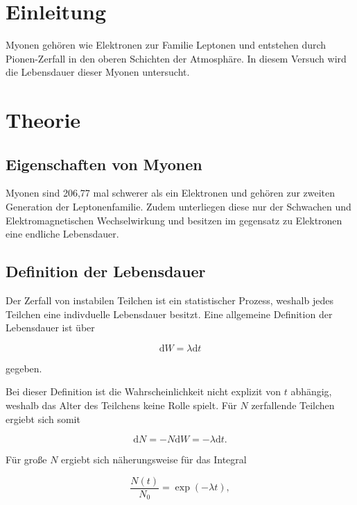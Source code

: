\section{Einleitung} %
\label{sec:einleitung}

Myonen gehören wie Elektronen zur Familie Leptonen und entstehen durch Pionen-Zerfall in den oberen Schichten der Atmosphäre.
In diesem Versuch wird die Lebensdauer dieser Myonen untersucht.

\section{Theorie} %
\label{sec:theorie}
\FloatBarrier
\subsection{Eigenschaften von Myonen} %
\label{sub:eigenschaften_von_myonen}

Myonen sind 206,77 mal schwerer als ein Elektronen und gehören zur zweiten Generation der Leptonenfamilie.
Zudem unterliegen diese nur der Schwachen und Elektromagnetischen Wechselwirkung und besitzen im gegensatz zu Elektronen eine endliche Lebensdauer.
\FloatBarrier
\subsection{Definition der Lebensdauer} %
\label{sub:definition_der_lebensdauer}

Der Zerfall von instabilen Teilchen ist ein statistischer Prozess, weshalb jedes Teilchen eine indivduelle Lebensdauer besitzt.
Eine allgemeine Definition der Lebensdauer ist über 

\begin{equation}
	\text{d}W = \lambda \text{d}t
\end{equation}

gegeben.

Bei dieser Definition ist die Wahrscheinlichkeit nicht explizit von $t$ abhängig, weshalb das Alter des Teilchens keine Rolle spielt.
Für $N$ zerfallende Teilchen ergiebt sich somit 

\begin{equation}
	\text{d}N = -N \text{d}W = -\lambda \text{d}t.
\end{equation}

Für große $N$ ergiebt sich näherungsweise für das Integral

\begin{equation}
	\frac{N(t)}{N_\text{0}} = \exp{(-\lambda t)},
\end{equation}


